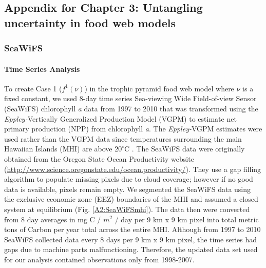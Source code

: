 \documentclass[oneside,12pt,final]{sty/ucthesis-CA2012}
\let\cite\citep                             %
\begin{document}
\begin{mainmatter}
\chapter{Appendix for Chapter 3: Untangling uncertainty in food web models}{\label{appendix:b}}

\subsection{SeaWiFS}
\subsubsection{Time Series Analysis}
To create Case 1 ($f^1(\nu)$) in the trophic pyramid food web model where $\nu$ is a fixed constant, we used 8-day time series Sea-viewing Wide Field-of-view Sensor (SeaWiFS) chlorophyll \textit{a} data from 1997 to 2010 that was transformed using the \textit{Eppley-}Vertically Generalized Production Model (VGPM) to estimate net primary production (NPP) from chlorophyll \textit{a}. The \textit{Eppley-}VGPM estimates were used rather than the VGPM data since temperatures surrounding the main Hawaiian Islands (MHI) are above $20^{\circ}$C \cite{morel1991pigment, antoine1996oceanic, stock2017reconciling}. The SeaWiFS data were originally obtained from the Oregon State Ocean Productivity website (\url{http://www.science.oregonstate.edu/ocean.productivity/}). They use a gap filling algorithm to populate missing pixels due to cloud coverage; however if no good data is available, pixels remain empty. We segmented the SeaWiFS data using the exclusive economic zone (EEZ) boundaries of the MHI and assumed a closed system at equilibrium (Fig. \ref{A2:SeaWiFSmhi}). The data then were converted from 8 day averages in mg C / $m^2$ / day per 9 km x 9 km pixel into total metric tons of Carbon per year total across the entire MHI. Although from 1997 to 2010 SeaWiFS collected data every 8 days  per 9 km x 9 km pixel, the time series had gaps due to machine parts malfunctioning. Therefore, the updated data set used for our analysis contained observations only from 1998-2007. 


\end{mainmatter}
\end{document}

